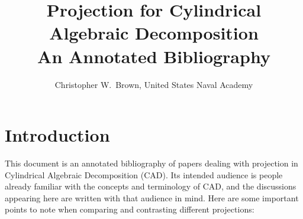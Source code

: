 \documentclass{article}
\title{Projection for Cylindrical Algebraic Decomposition\\
  \medskip An Annotated Bibliography}
\author{Christopher W.~Brown, United States Naval Academy}
\begin{document}
\maketitle

\section{Introduction}
This document is an annotated bibliography of papers dealing with
projection in Cylindrical Algebraic Decomposition (CAD).  Its intended
audience is people already familiar with the concepts and terminology
of CAD, and the discussions appearing here are written with
that audience in mind.  Here are some important points to note when
comparing and contrasting different projections:
\end{document}
